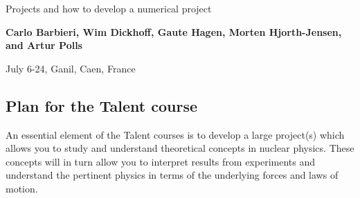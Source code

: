 \documentclass[%
twoside,                 %
final,                   %
10pt]{article}
\begin{document}






\thispagestyle{empty}

\begin{center}
{\LARGE\bf
\begin{spacing}{1.25}
Projects and how to develop a numerical project
\end{spacing}
}
\end{center}


\begin{center}
{\bf Carlo Barbieri, Wim Dickhoff, Gaute Hagen, Morten Hjorth-Jensen, and Artur Polls${}^{}$} \\ [0mm]
\end{center}

    \begin{center}
\end{center}
    

\begin{center} %
July 6-24, Ganil, Caen, France
\end{center}

\vspace{1cm}


\tableofcontents


\vspace{1cm} %




\subsection{Plan for the Talent course}
An essential element of the Talent courses is to develop a large project(s) which allows you to study and understand
theoretical concepts in nuclear physics.  
These concepts will in turn allow you to interpret results from experiments and understand the pertinent physics in terms of the underlying forces and laws of motion.
\end{document}
